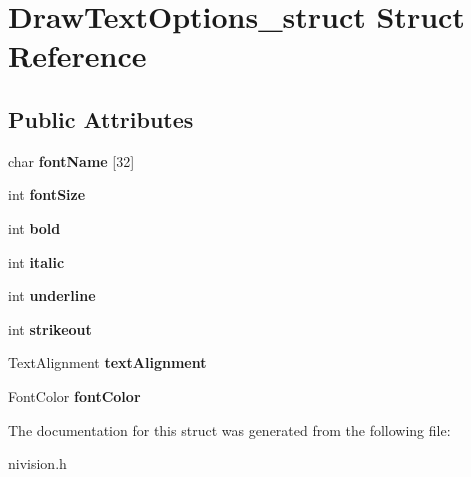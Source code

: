 \hypertarget{structDrawTextOptions__struct}{
\section{DrawTextOptions\_\-struct Struct Reference}
\label{structDrawTextOptions__struct}
}
\subsection*{Public Attributes}
\begin{DoxyCompactItemize}
\item 
\hypertarget{structDrawTextOptions__struct_a62787bff0fecd50d9afe1db180fc2042}{
char {\bfseries fontName} \mbox{[}32\mbox{]}}
\label{structDrawTextOptions__struct_a62787bff0fecd50d9afe1db180fc2042}

\item 
\hypertarget{structDrawTextOptions__struct_a435c09bbdb321c2c1123ed07e16d2964}{
int {\bfseries fontSize}}
\label{structDrawTextOptions__struct_a435c09bbdb321c2c1123ed07e16d2964}

\item 
\hypertarget{structDrawTextOptions__struct_a0fc9b68d5781e17e3fc5451f6c351998}{
int {\bfseries bold}}
\label{structDrawTextOptions__struct_a0fc9b68d5781e17e3fc5451f6c351998}

\item 
\hypertarget{structDrawTextOptions__struct_a695e1a37a31518d6862d049366452034}{
int {\bfseries italic}}
\label{structDrawTextOptions__struct_a695e1a37a31518d6862d049366452034}

\item 
\hypertarget{structDrawTextOptions__struct_a4f0acfe0eaa6535c90d747c431975890}{
int {\bfseries underline}}
\label{structDrawTextOptions__struct_a4f0acfe0eaa6535c90d747c431975890}

\item 
\hypertarget{structDrawTextOptions__struct_ae24aab62094e72f0598bdc94fcbcbcff}{
int {\bfseries strikeout}}
\label{structDrawTextOptions__struct_ae24aab62094e72f0598bdc94fcbcbcff}

\item 
\hypertarget{structDrawTextOptions__struct_a1f88e1847c68e5270d7b1523bbfa11e9}{
TextAlignment {\bfseries textAlignment}}
\label{structDrawTextOptions__struct_a1f88e1847c68e5270d7b1523bbfa11e9}

\item 
\hypertarget{structDrawTextOptions__struct_a97ef97d5a432a76f898c51aa2eee6e68}{
FontColor {\bfseries fontColor}}
\label{structDrawTextOptions__struct_a97ef97d5a432a76f898c51aa2eee6e68}

\end{DoxyCompactItemize}


The documentation for this struct was generated from the following file:\begin{DoxyCompactItemize}
\item 
nivision.h\end{DoxyCompactItemize}
